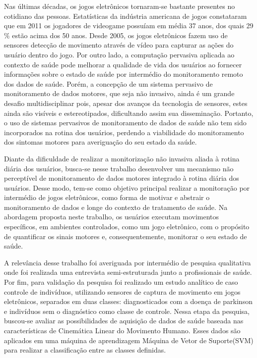 Nas últimas décadas, os jogos eletrônicos tornaram-se bastante presentes no cotidiano das pessoas. Estatísticas da indústria americana de jogos constataram que em 2011 os jogadores de videogame possuíam em média 37 anos, dos quais 29$\%$  estão acima dos 50 anos. Desde 2005, os jogos eletrônicos fazem uso de sensores detecção de movimento através de vídeo para capturar as ações do usuário dentro do jogo. Por outro lado, a computação pervasiva aplicada ao contexto de saúde pode melhorar a qualidade de vida dos usuários ao fornecer informações sobre o estado de saúde por intermédio do monitoramento remoto dos dados de saúde. Porém, a concepção de um sistema pervasivo de monitoramento de dados motores, que seja não invasivo, ainda é um grande desafio multidisciplinar pois, apesar dos avanços da tecnologia de sensores, estes ainda são visíveis e estereotipados, dificultando assim sua disseminação. Portanto, o uso de sistemas pervasivos de monitoramento de dados de saúde não tem sido incorporados na rotina dos usuários, perdendo a viabilidade do monitoramento dos sintomas motores para averiguação do seu estado da saúde.

Diante da dificuldade de realizar a monitorização não invasiva aliada à rotina diária dos usuários, busca-se nesse trabalho desenvolver um mecanismo não perceptível de monitoramento de dados motores integrado à rotina diária dos usuários. Desse modo, tem-se como objetivo principal realizar a monitoração por intermédio de jogos eletrônicos, como forma de motivar e abstrair o monitoramento de dados e longe do contexto de tratamento de saúde. Na abordagem proposta neste trabalho, os usuários executam movimentos específicos, em ambientes controlados, como um jogo eletrônico, com o propósito de quantificar os sinais motores e, consequentemente, monitorar o seu estado de saúde.

A relevância desse trabalho foi averiguada por intermédio de pesquisa qualitativa onde foi realizada uma entrevista semi-estruturada junto a profissionais de saúde. Por fim, para validação da pesquisa foi realizado um estudo analítico de caso controle de indivíduos, utilizando sensores de captura de movimento em jogos eletrônicos, separados em duas classes: diagnosticados com a doença de parkinson e indivíduos sem o diagnóstico como classe de controle. Nessa etapa da pesquisa, buscou-se avaliar as possibilidades de aquisição de dados de saúde baseada nas características de Cinemática Linear do Movimento Humano. Esses dados são aplicados em uma máquina de aprendizagem Máquina de Vetor de Suporte(SVM) para realizar a classificação entre as classes definidas.


